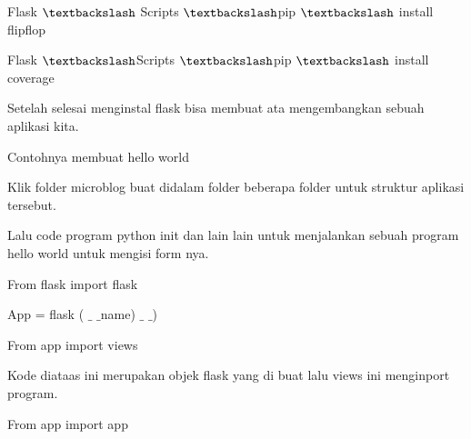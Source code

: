 \vspace{14pt}
\noindent 
{\fontsize{14pt}{14pt}\selectfont Flask $  \textbackslash  $ Scripts  $  \textbackslash  $pip $  \textbackslash  $ install flipflop \\} \par
\vspace{14pt}
\noindent 
{\fontsize{14pt}{14pt}\selectfont Flask $  \textbackslash  $Scripts $  \textbackslash  $pip $  \textbackslash  $ install coverage \\} \par
\vspace{14pt}
\vspace{14pt}
\noindent 
{\fontsize{14pt}{14pt}\selectfont Setelah selesai menginstal flask bisa membuat ata mengembangkan sebuah aplikasi kita.  \\} \par
\noindent 
{\fontsize{14pt}{14pt}\selectfont Contohnya membuat hello world \\} \par
\noindent 
{\fontsize{14pt}{14pt}\selectfont Klik folder microblog buat didalam folder beberapa folder untuk struktur aplikasi tersebut. \\} \par
\vspace{14pt}
\noindent 
{\fontsize{14pt}{14pt}\selectfont Lalu code program python init dan lain lain untuk menjalankan sebuah program hello world untuk mengisi form nya. \\} \par
\noindent 
{\fontsize{14pt}{14pt}\selectfont From flask import flask \\} \par
\vspace{14pt}
\noindent 
{\fontsize{14pt}{14pt}\selectfont App = flask ( $  \_  $ $  \_  $name) $  \_  $ $  \_  $) \\} \par
\vspace{14pt}
\noindent 
{\fontsize{14pt}{14pt}\selectfont From app import views \\} \par
\vspace{14pt}
\noindent 
{\fontsize{14pt}{14pt}\selectfont Kode diataas ini merupakan objek flask yang di buat lalu views ini menginport program. \\} \par
\vspace{14pt}
\noindent 
{\fontsize{14pt}{14pt}\selectfont From app import app \\} \par
